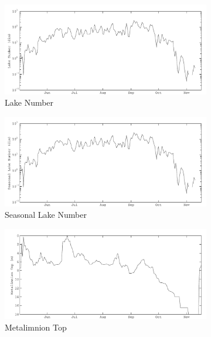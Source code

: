 	\def\lafigsize{.497\textwidth}
	\begin{figure}
		\centering
		\begin{subfigure}{\lafigsize}
			\caption{\label{fig:la:out:Ln}Lake Number}
			\includegraphics[width=\textwidth]{figures/Sparkling_Ln.pdf}
		\end{subfigure}
		\begin{subfigure}{\lafigsize}
			\caption{\label{fig:la:out:SLn}Seasonal Lake Number}
			\includegraphics[width=\textwidth]{figures/Sparkling_SLn.pdf}
		\end{subfigure}
		\begin{subfigure}{\lafigsize}
			\caption{\label{fig:la:out:metaT}Metalimnion Top}
			\includegraphics[width=\textwidth]{figures/Sparkling_metaT.pdf}
		\end{subfigure}
		\begin{subfigure}{\lafigsize}

\end{subfigure}
\end{figure}
